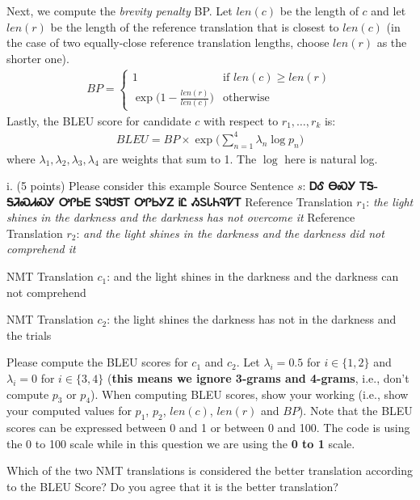 \documentclass{article}
\begin{document}
	Next, we compute the \textit{brevity penalty} BP. Let $len(c)$ be the length of $c$ and let $len(r)$ be the length of the reference translation that is closest to $len(c)$ (in the case of two equally-close reference translation lengths, choose $len(r)$ as the shorter one). 
	\begin{align}
		BP = 
		\begin{cases}
			1 & \text{if } len(c) \ge len(r) \\
			\exp \big( 1 - \frac{len(r)}{len(c)} \big) & \text{otherwise}
		\end{cases}
	\end{align}
	Lastly, the BLEU score for candidate $c$ with respect to $r_1,\dots,r_k$ is:
	\begin{align}
		BLEU = BP \times \exp \Big( \sum_{n=1}^4 \lambda_n \log p_n \Big)
	\end{align}
	where $\lambda_1,\lambda_2,\lambda_3,\lambda_4$ are weights that sum to 1. The $\log$ here is natural log.
	\newline
	
	
	

	i. (5 points) Please consider this example \newline
	Source Sentence $s$: \textbf{{\cherokeefam ᎠᎴ ᎾᏍᎩ ᎢᎦ-ᎦᏘᏍᏗᏍᎩ ᎤᎵᏏᎬ ᏚᎸᏌᏕᎢ ᎤᎵᏏᎩᏃ ᎥᏝ ᏱᏚᏓᏂᎸᏤᎢ}} 
	\newline
	Reference Translation $r_1$: \textit{the light shines in the darkness and the darkness has not overcome it}
	\newline
	Reference Translation $r_2$: \textit{and the light shines in the darkness and the darkness did not comprehend it}
	
	NMT Translation $c_1$: and the light shines in the darkness and the darkness can not comprehend
	
	NMT Translation $c_2$: the light shines the darkness has not in the darkness and the trials
	
	Please compute the BLEU scores for $c_1$ and $c_2$. Let $\lambda_i=0.5$ for $i\in\{1,2\}$ and $\lambda_i=0$ for $i\in\{3,4\}$ (\textbf{this means we ignore 3-grams and 4-grams}, i.e., don't compute $p_3$ or $p_4$). When computing BLEU scores, show your working (i.e., show your computed values for $p_1$, $p_2$, $len(c)$, $len(r)$ and $BP$). Note that the BLEU scores can be expressed between 0 and 1 or between 0 and 100. The code is using the 0 to 100 scale while in this question we are using the \textbf{0 to 1} scale.
	\newline
	
	Which of the two NMT translations is considered the better translation according to the BLEU Score? Do you agree that it is the better translation?
	
\end{document}
